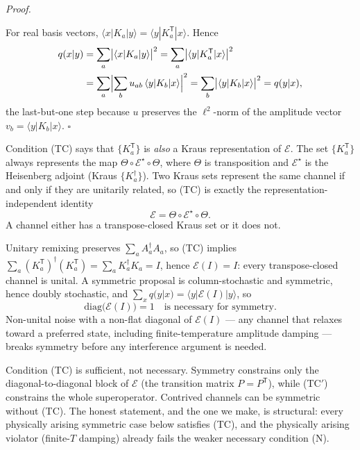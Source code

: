 \documentclass[aps,prx,reprint,floatfix,amsmath,amssymb,amsfonts]{revtex4-2}
\newenvironment{proof}[1][Proof]{%
  \par\medskip\noindent\textit{#1.}\ignorespaces
}{%
  \unskip\nobreak\hfill$\square$\par\medskip
}
\begin{document}
\begin{proof}
For real basis vectors,
$\langle x|K_a|y\rangle = \langle y|K_a^{\mathsf T}|x\rangle$. Hence
\begin{align}
  q(x|y)
  &=
  \sum_a \bigl|\langle x|K_a|y\rangle\bigr|^2
  =
  \sum_a \bigl|\langle y|K_a^{\mathsf T}|x\rangle\bigr|^2
  \nonumber\\
  &=
  \sum_a \Bigl|\sum_b u_{ab}\, \langle y|K_b|x\rangle\Bigr|^2
  =
  \sum_b \bigl|\langle y|K_b|x\rangle\bigr|^2
  =
  q(y|x),
\end{align}
the last-but-one step because $u$ preserves the $\ell^2$-norm of the
amplitude vector $v_b = \langle y|K_b|x\rangle$.
\end{proof}

Condition (TC) says that $\{K_a^{\mathsf T}\}$ is \emph{also} a Kraus
representation of $\mathcal{E}$. The set $\{K_a^{\mathsf T}\}$ always
represents the map $\Theta \circ \mathcal{E}^\star \circ \Theta$, where
$\Theta$ is transposition and $\mathcal{E}^\star$ is the Heisenberg
adjoint (Kraus $\{K_a^\dagger\}$). Two Kraus sets represent the same
channel if and only if they are unitarily related, so (TC) is exactly
the representation-independent identity
\begin{equation}
  \mathcal{E}
  =
  \Theta \circ \mathcal{E}^\star \circ \Theta.
  \tag{TC$'$}
\end{equation}
A channel either has a transpose-closed Kraus set or it does not.

Unitary remixing preserves $\sum_a A_a^\dagger A_a$, so (TC) implies
$\sum_a (K_a^{\mathsf T})^\dagger (K_a^{\mathsf T}) = \sum_a K_a^\dagger K_a = I$,
hence $\mathcal{E}(I) = I$: every transpose-closed channel is unital. A
symmetric proposal is column-stochastic and symmetric, hence doubly
stochastic, and $\sum_x q(y|x) = \langle y|\mathcal{E}(I)|y\rangle$, so
\begin{equation}
  \mathrm{diag}\bigl(\mathcal{E}(I)\bigr) = 1
  \quad
  \text{is necessary for symmetry.}
  \tag{N}
\end{equation}
Non-unital noise with a non-flat diagonal of $\mathcal{E}(I)$ --- any
channel that relaxes toward a preferred state, including
finite-temperature amplitude damping --- breaks symmetry before any
interference argument is needed.

Condition (TC) is sufficient, not necessary. Symmetry constrains only
the diagonal-to-diagonal block of $\mathcal{E}$ (the transition matrix
$P = P^{\mathsf T}$), while (TC$'$) constrains the whole superoperator.
Contrived channels can be symmetric without (TC). The honest statement,
and the one we make, is structural: every physically arising symmetric
case below satisfies (TC), and the physically arising violator
(finite-$T$ damping) already fails the weaker necessary condition (N).
\end{document}
